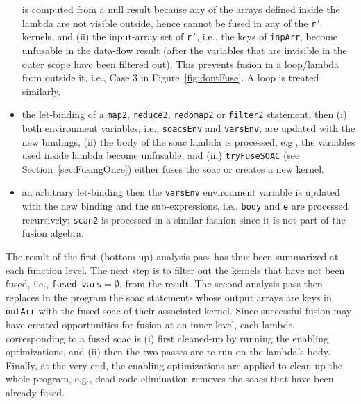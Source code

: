 \documentclass{sigplanconf}  %
\newcommand{\emp}[1]{\textcolor{DikuRed}{ #1}}
\begin{document}
\begin{itemize}
                is computed from a null result because any of the arrays defined inside
                the lambda are not visible outside, hence cannot be fused in any of the
                {\tt r'} kernels, and (ii) the input-array set of {\tt r'}, i.e., the keys of 
                {\tt inpArr}, become unfusable in the data-flow result 
                (after the variables that are invisible in the outer scope have been filtered out). 
            This prevents fusion in a loop/lambda from outside it, i.e., 
                \emp{Case 3} in Figure~\ref{fig:dontFuse}.
          A loop is treated similarly. 
    \item  the let-binding of a {\tt map2}, {\tt reduce2}, {\tt redomap2} or {\tt filter2} 
            statement, then (i) both environment variables, i.e., {\tt soacsEnv} and {\tt varsEnv}, 
            are updated with the new bindings, (ii) the body of the {\sc soac} 
            lambda is processed, e.g., the variables used inside lambda become unfusable,
            and (iii) {\tt tryFuseSOAC} 
            (see Section~\ref{sec:FusingOnce}) either fuses the {\sc soac} 
            or creates a new kernel. 
    \item an arbitrary let-binding then the {\tt varsEnv} environment variable is
            updated with the new binding and the sub-expressions, i.e., {\tt body} 
            and {\tt e} are processed recursively; {\tt scan2} is processed
            in a similar fashion since it is not part of the fusion algebra. 
\end{itemize}


The result of the first (bottom-up) analysis pass has thus been summarized
at each function level. The next step is to filter out the kernels that have 
not been fused, i.e., {\tt fused\_vars$=\emptyset$}, from the result.
The second analysis pass then replaces in the program the {\sc soac} 
statements whose output arrays are keys in {\tt outArr} with the fused 
{\sc soac} of their associated kernel.  Since successful fusion may have 
created opportunities for fusion at an inner level, each lambda 
corresponding to a fused {\sc soac} is (i) first cleaned-up by running the
enabling optimizations, and (ii) then the two passes are re-run on the
lambda's body.   Finally, at the very end, the enabling optimizations
are applied to clean up the whole program, e.g., dead-code elimination 
removes the {\sc soac}s that have been already fused. 
 

\end{document}
